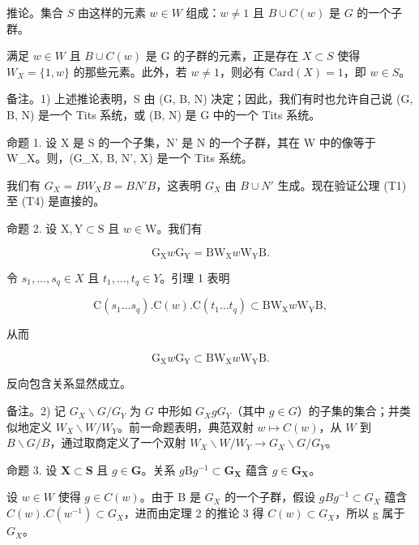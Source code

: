 推论。集合 \(S\) 由这样的元素 \(w \in W\) 组成：\(w \neq 1\) 且 \(B \cup C(w)\) 是 \(G\) 的一个子群。

满足 \(w \in W\) 且 \(B \cup C(w)\) 是 G 的子群的元素，正是存在 \(X \subset S\) 使得 \(W_{X} = \{1, w\}\) 的那些元素。此外，若 \(w \neq 1\)，则必有 \(\text{Card}(X) = 1\)，即 \(w \in S\)。

备注。1) 上述推论表明，S 由 (G, B, N) 决定；因此，我们有时也允许自己说 (G, B, N) 是一个 Tits 系统，或 (B, N) 是 G 中的一个 Tits 系统。

命题 1. 设 X 是 S 的一个子集，N' 是 N 的一个子群，其在 W 中的像等于 W\_X。则，(G\_X, B, N', X) 是一个 Tits 系统。

我们有 \(G_{X} = BW_{X}B = BN'B\)，这表明 \(G_{X}\) 由 \(B \cup N'\) 生成。现在验证公理 (T1) 至 (T4) 是直接的。

命题 2. 设 \(\mathrm{X}, \mathrm{Y} \subset \mathrm{S}\) 且 \(w \in \mathrm{W}\)。我们有

\[
\mathrm{G} _ {\mathrm{X}} w \mathrm{G} _ {\mathrm{Y}} = \mathrm{BW} _ {\mathrm{X}} w \mathrm{W} _ {\mathrm{Y}} \mathrm{B}.
\]

令 \(s_1, \ldots, s_q \in X\) 且 \(t_1, \ldots, t_q \in Y\)。引理 1 表明

\[
\mathrm{C} (s _ {1} \dots s _ {q}). \mathrm{C} (w). \mathrm{C} (t _ {1} \dots t _ {q}) \subset \mathrm{BW} _ {\mathrm{X}} w \mathrm{W} _ {\mathrm{Y}} \mathrm{B},
\]

从而

\[
\mathrm{G} _ {\mathrm{X}} w \mathrm{G} _ {\mathrm{Y}} \subset \mathrm{BW} _ {\mathrm{X}} w \mathrm{W} _ {\mathrm{Y}} \mathrm{B}.
\]

反向包含关系显然成立。

备注。2) 记 \(G_X \backslash G / G_Y\) 为 \(G\) 中形如 \(G_X gG_Y\)（其中 \(g \in G\)）的子集的集合；并类似地定义 \(W_X \backslash W / W_Y\)。前一命题表明，典范双射 \(w \mapsto C(w)\)，从 \(W\) 到 \(B \backslash G / B\)，通过取商定义了一个双射 \(W_X \backslash W / W_Y \to G_X \backslash G / G_Y\)。

命题 3. 设 \(\mathbf{X} \subset \mathbf{S}\) 且 \(g \in \mathbf{G}\)。关系 \(g\mathrm{B}g^{-1} \subset \mathbf{G}_{\mathbf{X}}\) 蕴含 \(g \in \mathbf{G}_{\mathbf{X}}\)。

设 \(w \in W\) 使得 \(g \in C(w)\)。由于 B 是 \(G_X\) 的一个子群，假设 \(gBg^{-1} \subset G_X\) 蕴含 \(C(w).C(w^{-1}) \subset G_X\)，进而由定理 2 的推论 3 得 \(C(w) \subset G_X\)，所以 g 属于 \(G_X\)。

